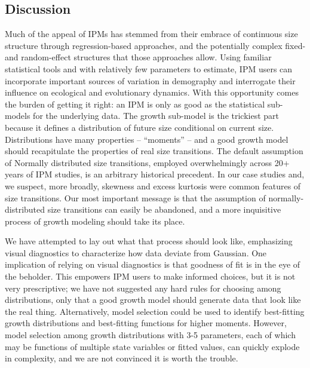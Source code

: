 \documentclass[12pt]{article}
\begin{document}
\begin{spacing}{1.9}
\section{Discussion}
\label{sec:Discussion} 
Much of the appeal of IPMs has stemmed from their embrace of continuous size structure through regression-based approaches, and the potentially complex fixed- and random-effect structures that those approaches allow. 
Using familiar statistical tools and with relatively few parameters to estimate, IPM users can incorporate important sources of variation in demography and interrogate their influence on ecological and evolutionary dynamics. 
With this opportunity comes the burden of getting it right: an IPM is only as good as the statistical sub-models for the underlying data. 
The growth sub-model is the trickiest part because it defines a distribution of future size conditional on current size. 
Distributions have many properties -- ``moments'' -- and a good growth model should recapitulate the properties of real size transitions. 
The default assumption of Normally distributed size transitions, employed overwhelmingly across 20+ years of IPM studies, is an arbitrary historical precedent. 
In our case studies and, we suspect, more broadly, skewness and excess kurtosis were common features of size transitions. 
Our most important message is that the assumption of normally-distributed size transitions can easily be abandoned, and a more inquisitive process of growth modeling should take its place. 

We have attempted to lay out what that process should look like, emphasizing visual diagnostics to characterize how data deviate from Gaussian. 
One implication of relying on visual diagnostics is that goodness of fit is in the eye of the beholder. 
This empowers IPM users to make informed choices, but it is not very prescriptive; we have not suggested any hard rules for choosing among distributions, only that a good growth model should generate data that look like the real thing.
Alternatively, model selection could be used to identify best-fitting growth distributions and best-fitting functions for higher moments. 
However, model selection among growth distributions with 3-5 parameters, each of which may be functions of multiple state variables or fitted values, can quickly explode in complexity, and we are not convinced it is worth the trouble. 


\end{spacing}
\end{document}
